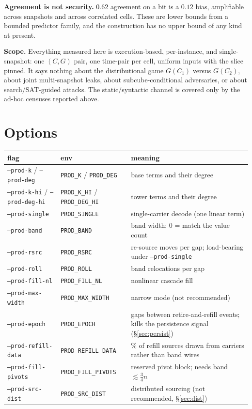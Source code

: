 \documentclass[11pt]{article}
\newcommand{\code}[1]{\texttt{#1}}
\begin{document}
\textbf{Agreement is not security.} $0.62$ agreement on a bit is a $0.12$ bias,
amplifiable across snapshots and across correlated cells. These are lower
bounds from a bounded predictor family, and the construction has no upper bound
of any kind at present.

\textbf{Scope.} Everything measured here is execution-based, per-instance, and
single-snapshot: one $(C,G)$ pair, one time-pair per cell, uniform inputs with
the slice pinned. It says nothing about the distributional game $G(C_1)$ versus
$G(C_2)$, about joint multi-snapshot leaks, about subcube-conditional
adversaries, or about search/SAT-guided attacks. The static/syntactic channel is
covered only by the ad-hoc censuses reported above.

\section{Options}

\begin{center}
\begin{tabular}{llp{}}
\toprule
flag & env & meaning \\
\midrule
\code{--prod-k} / \code{--prod-deg} & \code{PROD\_K} / \code{PROD\_DEG} & base terms and their degree \\
\code{--prod-k-hi} / \code{--prod-deg-hi} & \code{PROD\_K\_HI} / \code{PROD\_DEG\_HI} & tower terms and their degree \\
\code{--prod-single} & \code{PROD\_SINGLE} & single-carrier decode (one linear term) \\
\code{--prod-band} & \code{PROD\_BAND} & band width; 0 = match the value count \\
\code{--prod-rsrc} & \code{PROD\_RSRC} & re-source moves per gap; load-bearing under \code{--prod-single} \\
\code{--prod-roll} & \code{PROD\_ROLL} & band relocations per gap \\
\code{--prod-fill-nl} & \code{PROD\_FILL\_NL} & nonlinear cascade fill \\
\code{--prod-max-width} & \code{PROD\_MAX\_WIDTH} & narrow mode (not recommended) \\
\code{--prod-epoch} & \code{PROD\_EPOCH} & gaps between retire-and-refill events; kills the persistence signal (\S\ref{sec:persist}) \\
\code{--prod-refill-data} & \code{PROD\_REFILL\_DATA} & \% of refill sources drawn from carriers rather than band wires \\
\code{--prod-fill-pivots} & \code{PROD\_FILL\_PIVOTS} & reserved pivot block; needs band $\lesssim \tfrac34 n$ \\
\code{--prod-src-dist} & \code{PROD\_SRC\_DIST} & distributed sourcing (not recommended, \S\ref{sec:dist}) \\
\bottomrule
\end{tabular}
\end{center}
\end{document}
